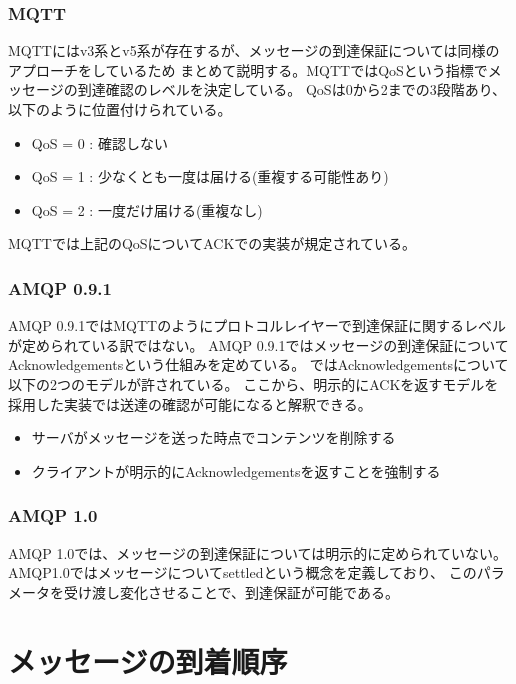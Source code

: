 \documentclass[uplatex, twocolumn,10pt]{jsarticle}
\begin{document}
\subsubsection{MQTT}

MQTTにはv3系とv5系が存在するが、メッセージの到達保証については同様のアプローチをしているため
まとめて説明する。MQTTではQoSという指標でメッセージの到達確認のレベルを決定している。
QoSは0から2までの3段階あり、以下のように位置付けられている。

\begin{itemize}
    \item QoS = 0 : 確認しない
    \item QoS = 1 : 少なくとも一度は届ける(重複する可能性あり)
    \item QoS = 2 : 一度だけ届ける(重複なし)
\end{itemize}

MQTTでは上記のQoSについてACKでの実装が規定されている。

\subsubsection{AMQP 0.9.1}

AMQP 0.9.1ではMQTTのようにプロトコルレイヤーで到達保証に関するレベルが定められている訳ではない。
AMQP 0.9.1ではメッセージの到達保証についてAcknowledgementsという仕組みを定めている。
\cite{AMQPWork14:online}ではAcknowledgementsについて以下の2つのモデルが許されている。
ここから、明示的にACKを返すモデルを採用した実装では送達の確認が可能になると解釈できる。

\begin{itemize}
    \item サーバがメッセージを送った時点でコンテンツを削除する
    \item クライアントが明示的にAcknowledgementsを返すことを強制する
\end{itemize}

\subsubsection{AMQP 1.0}

AMQP 1.0では、メッセージの到達保証については明示的に定められていない。
AMQP1.0ではメッセージについてsettledという概念を定義しており、
このパラメータを受け渡し変化させることで、到達保証が可能である。

\section{メッセージの到着順序}
\end{document}
